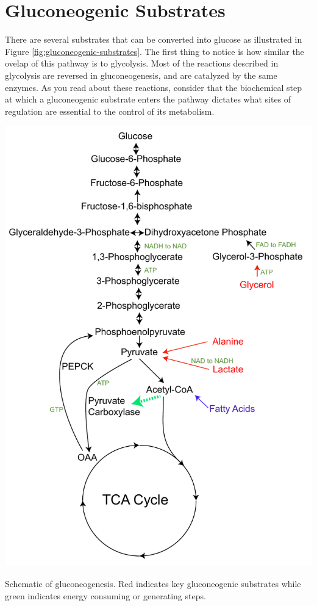 \documentclass{tufte-handout}
\begin{document}
\section{Gluconeogenic Substrates}

There are several substrates that can be converted into glucose as illustrated in Figure \ref{fig:gluconeogenic-substrates}.  The first thing to notice is how similar the ovelap of this pathway is to glycolysis.  Most of the reactions described in glycolysis are reversed in gluconeogenesis, and are catalyzed by the same enzymes.  As you read about these reactions, consider that the biochemical step at which a gluconeogenic substrate enters the pathway dictates what sites of regulation are essential to the control of its metabolism.  

\begin{marginfigure}
\includegraphics{figures/gluconeogenic-substrates.pdf}
\caption{Schematic of gluconeogenesis.  Red indicates key gluconeogenic substrates while green indicates energy consuming or generating steps.}
\label{fig:gluconeogenic-substrates}
\end{marginfigure}
\end{document}
